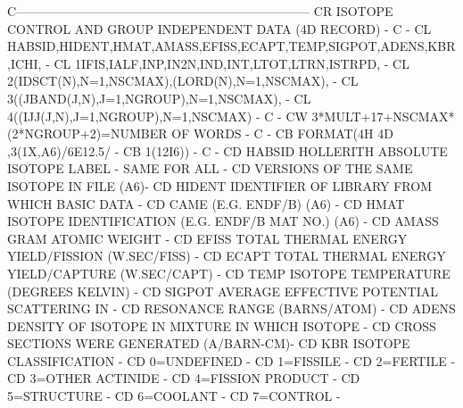 \begin{ccode}
C-----------------------------------------------------------------------
CR          ISOTOPE CONTROL AND GROUP INDEPENDENT DATA   (4D RECORD)   -
C                                                                      -
CL    HABSID,HIDENT,HMAT,AMASS,EFISS,ECAPT,TEMP,SIGPOT,ADENS,KBR,ICHI, -
CL   1IFIS,IALF,INP,IN2N,IND,INT,LTOT,LTRN,ISTRPD,                     -
CL   2(IDSCT(N),N=1,NSCMAX),(LORD(N),N=1,NSCMAX),                      -
CL   3((JBAND(J,N),J=1,NGROUP),N=1,NSCMAX),                            -
CL   4((IJJ(J,N),J=1,NGROUP),N=1,NSCMAX)                               -
C                                                                      -
CW    3*MULT+17+NSCMAX*(2*NGROUP+2)=NUMBER OF WORDS                    -
C                                                                      -
CB    FORMAT(4H 4D ,3(1X,A6)/6E12.5/                                   -
CB   1(12I6))                                                          -
C                                                                      -
CD    HABSID        HOLLERITH ABSOLUTE ISOTOPE LABEL - SAME FOR ALL    -
CD                            VERSIONS OF THE SAME ISOTOPE IN FILE (A6)-
CD    HIDENT        IDENTIFIER OF LIBRARY FROM WHICH BASIC DATA        -
CD                            CAME (E.G. ENDF/B) (A6)                  -
CD    HMAT          ISOTOPE IDENTIFICATION (E.G. ENDF/B MAT NO.) (A6)  -
CD    AMASS         GRAM ATOMIC WEIGHT                                 -
CD    EFISS         TOTAL THERMAL ENERGY YIELD/FISSION (W.SEC/FISS)    -
CD    ECAPT         TOTAL THERMAL ENERGY YIELD/CAPTURE (W.SEC/CAPT)    -
CD    TEMP          ISOTOPE TEMPERATURE (DEGREES KELVIN)               -
CD    SIGPOT        AVERAGE EFFECTIVE POTENTIAL SCATTERING IN          -
CD                            RESONANCE RANGE (BARNS/ATOM)             -
CD    ADENS         DENSITY OF ISOTOPE IN MIXTURE IN WHICH ISOTOPE     -
CD                            CROSS SECTIONS WERE GENERATED (A/BARN-CM)-
CD    KBR           ISOTOPE CLASSIFICATION                             -
CD                     0=UNDEFINED                                     -
CD                     1=FISSILE                                       -
CD                     2=FERTILE                                       -
CD                     3=OTHER ACTINIDE                                -
CD                     4=FISSION PRODUCT                               -
CD                     5=STRUCTURE                                     -
CD                     6=COOLANT                                       -
CD                     7=CONTROL                                       -

\end{ccode}
